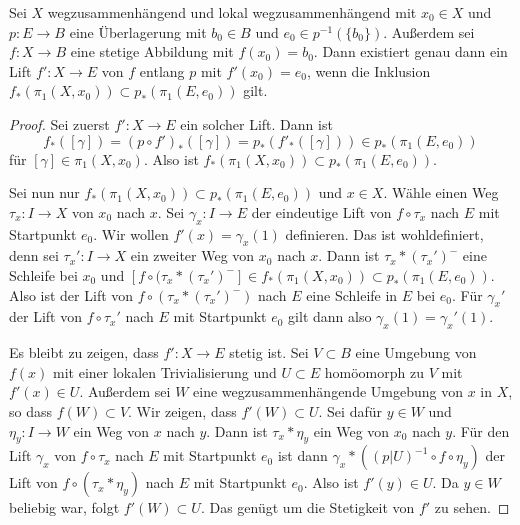 \begin{theorem}\label{thm:lifting-criterion}
Sei $X$ wegzusammenhängend und lokal wegzusammenhängend mit $x_0\in X$ und $p\colon E\to B$ eine Überlagerung mit $b_0\in B$ und $e_0\in p^{-1}(\{b_0\})$. Außerdem sei $f\colon X\to B$ eine stetige Abbildung mit $f(x_0) = b_0$. Dann existiert genau dann ein Lift $f'\colon X\to E$ von $f$ entlang $p$ mit $f'(x_0) = e_0$, wenn die Inklusion $f_*(\pi_1(X,x_0))\subset p_*(\pi_1(E,e_0))$ gilt.
\end{theorem}
\begin{proof}
Sei zuerst $f'\colon X\to E$ ein solcher Lift. Dann ist
\[
f_*([\gamma]) = (p\circ f')_*([\gamma]) = p_*(f'_*([\gamma])) \in p_*(\pi_1(E,e_0))
\]
für $[\gamma]\in\pi_1(X,x_0)$. Also ist $f_*(\pi_1(X,x_0))\subset p_*(\pi_1(E,e_0))$.

Sei nun nur $f_*(\pi_1(X,x_0))\subset p_*(\pi_1(E,e_0))$ und $x\in X$. Wähle einen Weg $\tau_x\colon I\to X$ von $x_0$ nach $x$. Sei $\gamma_x\colon I\to E$ der eindeutige Lift von $f\circ \tau_x$ nach $E$ mit Startpunkt $e_0$. Wir wollen $f'(x) = \gamma_x(1)$ definieren. Das ist wohldefiniert, denn sei $\tau_x'\colon I\to X$ ein zweiter Weg von $x_0$ nach $x$. Dann ist $\tau_x * (\tau_x')^{-}$ eine Schleife bei $x_0$ und $[f\circ (\tau_x*(\tau_x')^{-}]\in f_*(\pi_1(X,x_0))\subset p_*(\pi_1(E,e_0))$. Also ist der Lift von $f\circ(\tau_x * (\tau_x')^{-})$ nach $E$ eine Schleife in $E$ bei $e_0$. Für $\gamma_x'$ der Lift von $f\circ\tau_x'$ nach $E$ mit Startpunkt $e_0$ gilt dann also $\gamma_x(1) = \gamma_x'(1)$.

Es bleibt zu zeigen, dass $f'\colon X\to E$ stetig ist. Sei $V\subset B$ eine Umgebung von $f(x)$ mit einer lokalen Trivialisierung und $U\subset E$ homöomorph zu $V$ mit $f'(x)\in U$. Außerdem sei $W$ eine wegzusammenhängende Umgebung von $x$ in $X$, so dass $f(W)\subset V$. Wir zeigen, dass $f'(W)\subset U$. Sei dafür $y\in W$ und $\eta_y\colon I\to W$ ein Weg von $x$ nach $y$. Dann ist $\tau_x * \eta_y$ ein Weg von $x_0$ nach $y$. Für den Lift $\gamma_x$ von $f\circ\tau_x$ nach $E$ mit Startpunkt $e_0$ ist dann $\gamma_x * ((p|U)^{-1} \circ f\circ\eta_y)$ der Lift von $f\circ(\tau_x *\eta_y)$ nach $E$ mit Startpunkt $e_0$. Also ist $f'(y) \in U$. Da $y\in W$ beliebig war, folgt $f'(W)\subset U$. Das genügt um die Stetigkeit von $f'$ zu sehen.
\end{proof}

